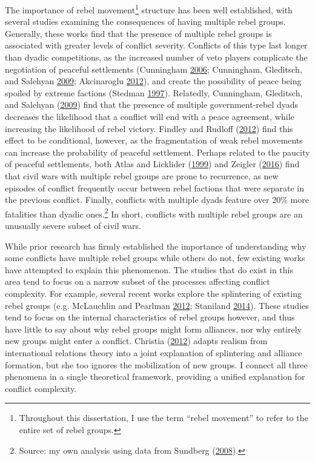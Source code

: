 \documentclass[12pt,]{book}
\let\rmarkdownfootnote\footnote%
\def\footnote{\protect\rmarkdownfootnote}
\theoremstyle{definition}
\theoremstyle{definition}
\theoremstyle{definition}
\theoremstyle{remark}
\begin{document}
The importance of rebel movement\footnote{Throughout this dissertation,
  I use the term ``rebel movement'' to refer to the entire set of rebel
  groups.} structure has been well established, with several studies
examining the consequences of having multiple rebel groups. Generally,
these works find that the presence of multiple rebel groups is
associated with greater levels of conflict severity. Conflicts of this
type last longer than dyadic competitions, as the increased number of
veto players complicate the negotiation of peaceful settlements
(Cunningham \protect\hyperlink{ref-Cunningham2006}{2006}; Cunningham,
Gleditsch, and Salehyan \protect\hyperlink{ref-Cunningham2009}{2009};
Akcinaroglu \protect\hyperlink{ref-Akcinaroglu2012}{2012}), and create
the possibility of peace being spoiled by extreme factions (Stedman
\protect\hyperlink{ref-Stedman1997}{1997}). Relatedly, Cunningham,
Gleditsch, and Salehyan (\protect\hyperlink{ref-Cunningham2009}{2009})
find that the presence of multiple government-rebel dyads decreases the
likelihood that a conflict will end with a peace agreement, while
increasing the likelihood of rebel victory. Findley and Rudloff
(\protect\hyperlink{ref-Findley2012}{2012}) find this effect to be
conditional, however, as the fragmentation of weak rebel movements can
increase the probability of peaceful settlement. Perhaps related to the
paucity of peaceful settlements, both Atlas and Licklider
(\protect\hyperlink{ref-Atlas1999}{1999}) and Zeigler
(\protect\hyperlink{ref-Zeigler2016}{2016}) find that civil wars with
multiple rebel groups are prone to recurrence, as new episodes of
conflict frequently occur between rebel factions that were separate in
the previous conflict. Finally, conflicts with multiple dyads feature
over 20\% more fatalities than dyadic ones.\footnote{Source: my own
  analysis using data from Sundberg
  (\protect\hyperlink{ref-Sundberg2008a}{2008}).} In short, conflicts
with multiple rebel groups are an unusually severe subset of civil wars.

While prior research has firmly established the importance of
understanding why some conflicts have multiple rebel groups while others
do not, few existing works have attempted to explain this phenomenon.
The studies that do exist in this area tend to focus on a narrow subset
of the processes affecting conflict complexity. For example, several
recent works explore the splintering of existing rebel groups (e.g.
McLauchlin and Pearlman \protect\hyperlink{ref-McLauchlin2012}{2012};
Staniland \protect\hyperlink{ref-Staniland2014}{2014}). These studies
tend to focus on the internal characteristics of rebel groups however,
and thus have little to say about why rebel groups might form alliances,
nor why entirely new groups might enter a conflict. Christia
(\protect\hyperlink{ref-Christia2012}{2012}) adapts realism from
international relations theory into a joint explanation of splintering
and alliance formation, but she too ignores the mobilization of new
groups. I connect all three phenomena in a single theoretical framework,
providing a unified explanation for conflict complexity.
\end{document}

